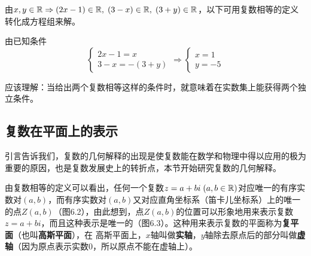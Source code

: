 \begin{analyze}
    由$x,y\in\mathbb{R}\Rightarrow (2x-1)\in\mathbb{R},\;  (3-x)\in\mathbb{R},\; (3+y)\in\mathbb{R}$，以下可用复数相等的定义转化成方程组来解。
\end{analyze}

\begin{solution}
    由已知条件
\[\begin{cases}
    2x-1=x\\ 3-x=-(3+y)
\end{cases} \Rightarrow \begin{cases}
    x=1\\ y=-5
\end{cases}\]
\end{solution}

应该理解：当给出两个复数相等这样的条件时，就意味着在实数集上能获得两个独立条件。

\subsection{复数在平面上的表示}
引言告诉我们，复数的几何解释的出现是使复数能在数学和物理中得以应用的极为重要的原因，也是复数发展史上的转折点，本节开始研究复数的几何解释。

由复数相等的定义可以看出，任何一个复数$z=a+bi\; (a,b\in\mathbb{R})$对应唯一的有序实数对$(a,b)$，而有序实数对$(a,b)$又对应直角坐标系（笛卡儿坐标系）上的唯一的点$Z(a,b)$（图6.2），由此想到，点$Z(a,b)$的位置可以形象地用来表示复数$z=a+bi$，而且这种表示是唯一的（图6.3）。这种用来表示复数的平面称为\textbf{复平面}（也叫\textbf{高斯平面}），在
高斯平面上，$x$轴叫做\textbf{实轴}，$y$轴除去原点后的部分叫做\textbf{虚轴}（因为原点表示实数0，所以原点不能在虚轴上）。

\noindent
\begin{minipage}{.45\textwidth}
    \centering
{}  
\end{minipage}\hfill
\begin{minipage}{.45\textwidth}
\centering
{}    
\end{minipage}

